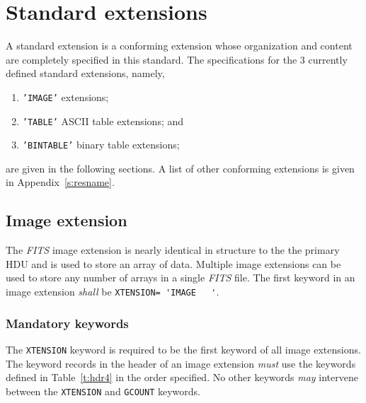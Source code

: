\documentclass[onecolumn]{aa}
\begin{document}
  \section{Standard extensions}
     \label{s:exts}

A standard extension is a conforming extension whose organization and content
are completely specified in this standard.  The specifications for the 3
currently defined standard extensions, namely,
   \begin{enumerate}
    \item
       {\tt 'IMAGE'} extensions;
    \item
       {\tt 'TABLE'} ASCII table extensions; and
    \item
       {\tt 'BINTABLE'} binary table extensions;
    \end{enumerate}
\noindent
are given in the following  sections.  A list of other conforming extensions
is given in Appendix~\ref{s:resname}.


\subsection{Image extension} 
\label{s:image}

The {\em FITS\/} image extension 
is nearly identical in structure to the
the primary HDU and is used to store an array of data.  
Multiple image extensions can be used to store any number of arrays 
in a single {\em FITS\/} file.
The first keyword in an image extension {\em shall}
be {\verb*+XTENSION= 'IMAGE   '+}.  

   \subsubsection{Mandatory keywords}
       \label{s:imk}
   The {\tt XTENSION} keyword is required to be the first keyword of 
   all image extensions.  
   The keyword records in the header of an image
   extension {\em must} use the keywords defined in Table~\ref{t:hdr4}
   in the order specified.  No other keywords {\em may} intervene between the 
   {\tt XTENSION} and {\tt GCOUNT} keywords.
  
\end{document}
